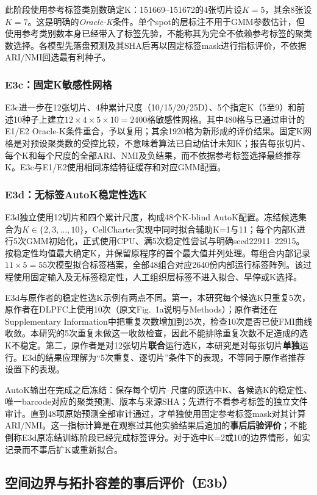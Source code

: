 此阶段使用参考标签类别数确定K：151669--151672的4张切片设$K=5$，其余8张设$K=7$。这是明确的\textit{Oracle-K}条件。单个spot的层标注不用于GMM参数估计，但使用参考类别数本身已经带入了标签先验，不能称其为完全不依赖参考标签的聚类数选择。各模型先落盘预测及其SHA后再以固定标签mask进行指标评价，不依据ARI/NMI回选最有利种子。

\subsubsection{E3c：固定K敏感性网格}
E3c进一步在12张切片、4种累计尺度（10/15/20/25D）、5个指定K（5至9）和前述10种子上建立$12\times4\times5\times10=2400$格敏感性网格。其中480格与已通过审计的E1/E2 Oracle-K条件重合，予以复用；其余1920格为新形成的评价结果。固定K网格是对预设聚类数的受控比较，不意味着算法已自动估计未知K；报告每张切片、每个K和每个尺度的全部ARI、NMI及负结果，而不依据参考标签选择最终推荐K。E3c与E1/E2使用相同冻结特征缓存和对应GMM配置。

\subsubsection{E3d：无标签AutoK稳定性选K}
E3d独立使用12切片和四个累计尺度，构成48个K-blind AutoK配置。冻结候选集合为$K\in\{2,3,\ldots,10\}$，CellCharter实现中同时拟合辅助K=1与11；每个内部K进行5次GMM初始化，正式使用CPU、满5次稳定性尝试与明确seed22911--22915。按稳定性均值最大确定K，并保留原程序的首个最大值并列处理。每组合内部记录$11\times5=55$次模型拟合标签档案，全部48组合对应2640份内部运行标签阵列。该过程使用固定输入及无标签稳定性，人工组织层标签不进入拟合、早停或K选择。

E3d与原作者的稳定性选K示例有两点不同。第一，本研究每个候选K只重复5次，原作者在DLPFC上使用10次（原文Fig.~1a说明与Methods）；原作者还在Supplementary Information中把重复次数增加到25次，检查10次是否已使FMI曲线收敛。本研究的5次重复未做这一收敛检查，因此不能排除重复次数不足造成的选K不稳定。第二，原作者是对12张切片\textbf{联合}运行选K，本研究是对每张切片\textbf{单独}运行。E3d的结果应理解为“5次重复、逐切片”条件下的表现，不等同于原作者推荐设置下的表现。

AutoK输出在完成之后冻结：保存每个切片--尺度的原选中K、各候选K的稳定性、唯一barcode对应的聚类预测、版本与来源SHA；先进行不看参考标签的独立文件审计。直到48项原始预测全部审计通过，才单独使用固定参考标签mask对其计算ARI/NMI。这一指标计算是在观察过其他实验结果后追加的\textbf{事后后验评价}；不能倒称E3d原冻结训练阶段已经完成标签评分。对于选中K=2或10的边界情形，如实记录而不事后扩K或重新拟合。

\subsection{空间边界与拓扑容差的事后评价（E3b）}
\label{subsec:cc-boundary-v1}

